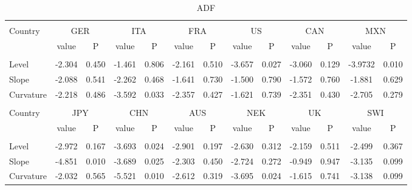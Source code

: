\documentclass{article}
\begin{document}
\begin{table}[h]
\caption{ADF} %
\fontsize{10}{10}\selectfont
\centering%
\begin{tabular}{l cc cc cc cc cc cc}%
\hline\hline \\ [-1.5ex]                         %

Country	&	\multicolumn{2}{c}{GER}			&	\multicolumn{2}{c}{ITA}			&	\multicolumn{2}{c}{FRA}			&	\multicolumn{2}{c}{US}			&	\multicolumn{2}{c}{CAN}			&	\multicolumn{2}{c}{MXN}			\\[0.5ex] 

 & value &P & value &P& value &P & value &P& value &P & value &P\\

\hline       \\ [-1.5ex] 

Level	&	-2.304	&	0.450	&	-1.461	&	0.806	&	-2.161	&	0.510	&	-3.657	&	0.027	&	-3.060	&	0.129	&	-3.9732	&	0.010	\\
Slope	&	-2.088	&	0.541	&	-2.262	&	0.468	&	-1.641	&	0.730	&	-1.500	&	0.790	&	-1.572	&	0.760	&	-1.881	&	0.629	\\
\medskip
Curvature	&	-2.218	&	0.486	&	-3.592	&	0.033	&	-2.357	&	0.427	&	-1.621	&	0.739	&	-2.351	&	0.430	&	-2.705	&	0.279	\\

\hline\hline   \\ [-1.5ex]    

Country	&	\multicolumn{2}{c}{JPY}			&	\multicolumn{2}{c}{CHN}			&	\multicolumn{2}{c}{AUS}			&	\multicolumn{2}{c}{NEK}			&	\multicolumn{2}{c}{UK}			&	\multicolumn{2}{c}{SWI}			\\

 & value &P & value &P& value &P & value &P& value &P & value &P\\

\hline       \\ [-1.5ex] 

Level	&	-2.972	&	0.167	&	-3.693	&	0.024	&	-2.901	&	0.197	&	-2.630	&	0.312	&	-2.159	&	0.511	&	-2.499	&	0.367	\\
Slope	&	-4.851	&	0.010	&	-3.689	&	0.025	&	-2.303	&	0.450	&	-2.724	&	0.272	&	-0.949	&	0.947	&	-3.135	&	0.099	\\
Curvature	&	-2.032	&	0.565	&	-5.521	&	0.010	&	-2.612	&	0.319	&	-3.695	&	0.024	&	-1.615	&	0.741	&	-3.138	&	0.099	\\

\hline            
\end{tabular}
\label{table:nonlin}%
\end{table}
\end{document}
